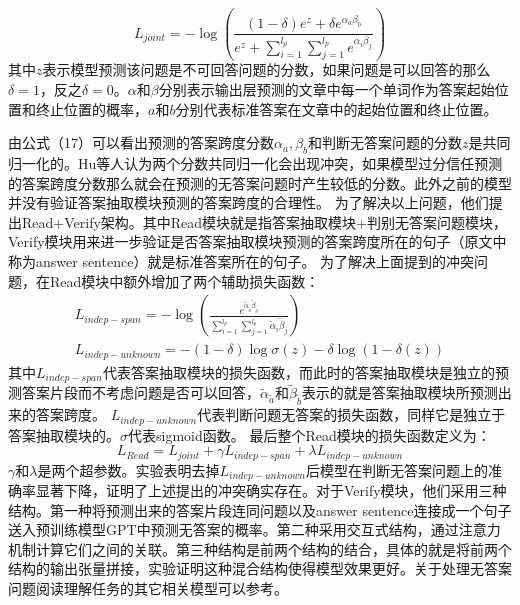 \begin{equation}
	L_{joint}=-\log(\displaystyle\frac{(1-\delta)e^z+\delta e^{\alpha_a\beta_b}}{e^z+\sum_{i=1}^{l_p}\sum_{j=1}^{l_p}e^{\alpha_i\beta_j}})
\end{equation}
其中$z$表示模型预测该问题是不可回答问题的分数，如果问题是可以回答的那么$\delta=1$，反之$\delta=0$。$\alpha$和$\beta$分别表示输出层预测的文章中每一个单词作为答案起始位置和终止位置的概率，$a$和$b$分别代表标准答案在文章中的起始位置和终止位置。

由公式（17）可以看出预测的答案跨度分数$\alpha_a,\beta_b$和判断无答案问题的分数$z$是共同归一化的。Hu等人认为两个分数共同归一化会出现冲突，如果模型过分信任预测的答案跨度分数那么就会在预测的无答案问题时产生较低的分数。此外之前的模型并没有验证答案抽取模块预测的答案跨度的合理性。
为了解决以上问题，他们提出Read+Verify架构。其中Read模块就是指答案抽取模块+判别无答案问题模块，
Verify模块用来进一步验证是否答案抽取模块预测的答案跨度所在的句子（原文中称为answer sentence）就是标准答案所在的句子。
为了解决上面提到的冲突问题，在Read模块中额外增加了两个辅助损失函数：
\begin{gather}
	L_{indep-span}=-\log(\displaystyle\frac{e^{\widetilde{\alpha}_{\widetilde{a}}\widetilde{\beta}_{\widetilde{b}}}}{\sum_{i=1}^{l_p}\sum_{j=1}^{l_p}\widetilde{\alpha}_{i}\widetilde{\beta}_{j}}) \\
	L_{indep-unknown}=-(1-\delta)\log\sigma(z)-\delta\log(1-\delta(z))
\end{gather}
其中$L_{indep-span}$代表答案抽取模块的损失函数，而此时的答案抽取模块是独立的预测答案片段而不考虑问题是否可以回答，$\widetilde{\alpha}_{\widetilde{a}}$和$\widetilde{\beta}_{\widetilde{b}}$表示的就是答案抽取模块所预测出来的答案跨度。
$L_{indep-unknown}$代表判断问题无答案的损失函数，同样它是独立于答案抽取模块的。$\sigma$代表sigmoid函数。
最后整个Read模块的损失函数定义为：
\begin{equation}
	L_{Read}=L_{joint}+\gamma L_{indep-span}+\lambda L_{indep-unknown}
\end{equation}
$\gamma$和$\lambda$是两个超参数。实验表明去掉$L_{indep-unknown}$后模型在判断无答案问题上的准确率显著下降，证明了上述提出的冲突确实存在。对于Verify模块，他们采用三种结构。第一种将预测出来的答案片段连同问题以及answer sentence连接成一个句子送入预训练模型GPT中预测无答案的概率。第二种采用交互式结构，通过注意力机制计算它们之间的关联。第三种结构是前两个结构的结合，具体的就是将前两个结构的输出张量拼接，实验证明这种混合结构使得模型效果更好。关于处理无答案问题阅读理解任务的其它相关模型可以参考。

